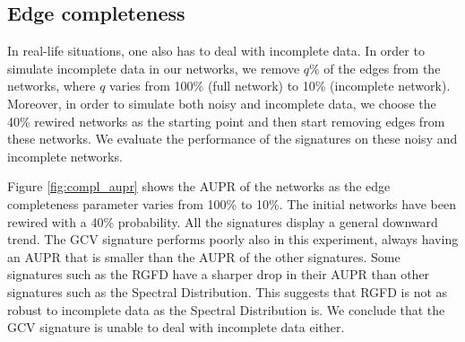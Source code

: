 \subsection{Edge completeness}

In real-life situations, one also has to deal with incomplete data. In order to simulate incomplete data in our networks, we remove $q\%$ of the edges from the networks, where $q$ varies from 100\% (full network) to 10\% (incomplete network). Moreover, in order to simulate both noisy and incomplete data, we choose the 40\% rewired networks as the starting point and then start removing edges from these networks. We evaluate the performance of the signatures on these noisy and incomplete networks. 


Figure \ref{fig:compl_aupr} shows the AUPR of the networks as the edge completeness parameter varies from 100\% to 10\%. The initial networks have been rewired with a 40\% probability. All the signatures display a general downward trend. The GCV signature performs poorly also in this experiment, always having an AUPR that is smaller than the AUPR of the other signatures. Some signatures such as the RGFD have a sharper drop in their AUPR than other signatures such as the Spectral Distribution. This suggests that RGFD is not as robust to incomplete data as the Spectral Distribution is. We conclude that the GCV signature is unable to deal with incomplete data either.

